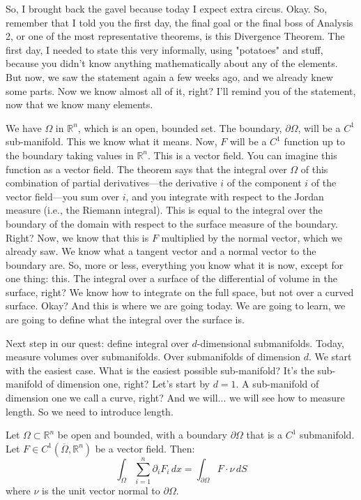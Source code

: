 \begin{spoken_clean}[00:00:03 - 00:09:50]
So, I brought back the gavel because today I expect extra circus. Okay. So, remember that I told you the first day, the final goal or the final boss of Analysis 2, or one of the most representative theorems, is this Divergence Theorem. The first day, I needed to state this very informally, using "potatoes" and stuff, because you didn't know anything mathematically about any of the elements. But now, we saw the statement again a few weeks ago, and we already knew some parts. Now we know almost all of it, right? I'll remind you of the statement, now that we know many elements.

We have $\Omega$ in $\mathbb{R}^n$, which is an open, bounded set. The boundary, $\partial\Omega$, will be a $C^1$ sub-manifold. This we know what it means. Now, $F$ will be a $C^1$ function up to the boundary taking values in $\mathbb{R}^n$. This is a vector field. You can imagine this function as a vector field. The theorem says that the integral over $\Omega$ of this combination of partial derivatives—the derivative $i$ of the component $i$ of the vector field—you sum over $i$, and you integrate with respect to the Jordan measure (i.e., the Riemann integral). This is equal to the integral over the boundary of the domain with respect to the surface measure of the boundary. Right? Now, we know that this is $F$ multiplied by the normal vector, which we already saw. We know what a tangent vector and a normal vector to the boundary are. So, more or less, everything you know what it is now, except for one thing: this. The integral over a surface of the differential of volume in the surface, right? We know how to integrate on the full space, but not over a curved surface. Okay? And this is where we are going today. We are going to learn, we are going to define what the integral over the surface is.

Next step in our quest: define integral over $d$-dimensional submanifolds. Today, measure volumes over submanifolds. Over submanifolds of dimension $d$. We start with the easiest case. What is the easiest possible sub-manifold? It's the sub-manifold of dimension one, right? Let's start by $d=1$. A sub-manifold of dimension one we call a curve, right? And we will... we will see how to measure length. So we need to introduce length.
\end{spoken_clean}

\begin{math_stroke}
\begin{orangeformula}
\begin{theorem}
Let $\Omega \subset \mathbb{R}^n$ be open and bounded, with a boundary $\partial \Omega$ that is a $C^1$ submanifold. Let $F \in C^1(\overline{\Omega}, \mathbb{R}^n)$ be a vector field. Then:
\[
\int_{\Omega} \sum_{i=1}^n \partial_i F_i \, dx = \int_{\partial \Omega} F \cdot \nu \, dS
\]
where $\nu$ is the unit vector normal to $\partial\Omega$.
\end{theorem}
\end{orangeformula}
\end{math_stroke}

